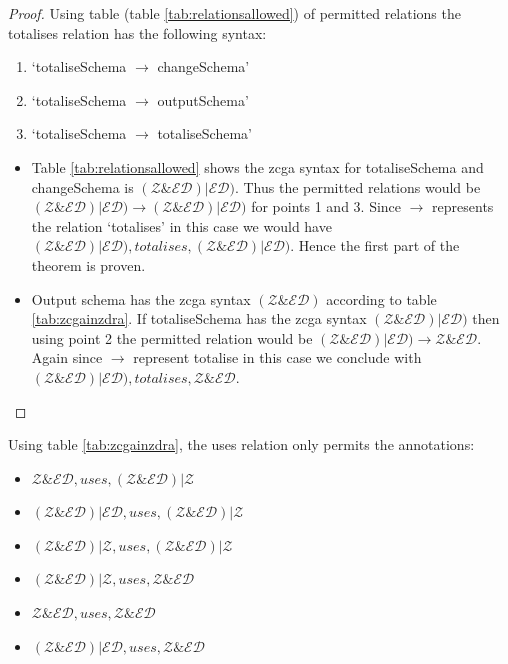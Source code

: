 \begin{proof}
Using table (table \ref{tab:relationsallowed}) of permitted relations the
totalises relation has the following syntax:
\begin{enumerate}
\item `totaliseSchema $\longrightarrow$ changeSchema'
\item `totaliseSchema $\longrightarrow$ outputSchema'
\item `totaliseSchema $\longrightarrow$ totaliseSchema'
\end{enumerate} 

\begin{itemize}
\item Table \ref{tab:relationsallowed} shows the \gls{zcga} syntax for
totaliseSchema and changeSchema is $(\mathcal{Z} \& \mathcal{ED}) |
\mathcal{ED})$. Thus the permitted relations would be $(\mathcal{Z} \&
\mathcal{ED}) | \mathcal{ED}) \longrightarrow (\mathcal{Z} \& \mathcal{ED}) |
\mathcal{ED})$ for points 1 and 3. Since $\longrightarrow$ represents the
relation `totalises' in this case we would have $(\mathcal{Z} \& \mathcal{ED}) |
\mathcal{ED}), totalises, (\mathcal{Z} \& \mathcal{ED}) | \mathcal{ED})$. Hence
the first part of the theorem is proven.

\item Output schema has the \gls{zcga} syntax $(\mathcal{Z} \& \mathcal{ED})$
according to table \ref{tab:zcgainzdra}. If totaliseSchema has the \gls{zcga}
syntax $(\mathcal{Z} \& \mathcal{ED}) | \mathcal{ED})$ then using point 2 the
permitted relation would be $(\mathcal{Z} \& \mathcal{ED}) | \mathcal{ED})
\longrightarrow \mathcal{Z} \& \mathcal{ED}$. Again since $\longrightarrow$
represent totalise in this case we conclude with $(\mathcal{Z} \& \mathcal{ED})
| \mathcal{ED}), totalises, \mathcal{Z} \& \mathcal{ED}$.
\end{itemize}
\end{proof}

\begin{thm}
Using table \ref{tab:zcgainzdra}, the uses relation only permits the
annotations:
\begin{itemize}
\item $\mathcal{Z} \& \mathcal{ED}, uses, (\mathcal{Z} \& \mathcal{ED}) |
\mathcal{Z}$
\item $(\mathcal{Z} \& \mathcal{ED}) | \mathcal{ED}, uses, (\mathcal{Z} \&
\mathcal{ED}) | \mathcal{Z}$
\item $(\mathcal{Z} \& \mathcal{ED}) | \mathcal{Z}, uses, (\mathcal{Z} \&
\mathcal{ED}) | \mathcal{Z}$
\item $(\mathcal{Z} \& \mathcal{ED}) | \mathcal{Z}, uses, \mathcal{Z} \&
\mathcal{ED}$
\item $\mathcal{Z} \& \mathcal{ED}, uses, \mathcal{Z} \& \mathcal{ED}$
\item $(\mathcal{Z} \& \mathcal{ED}) | \mathcal{ED}, uses, \mathcal{Z} \&
\mathcal{ED}$
\end{itemize}
\end{thm}

